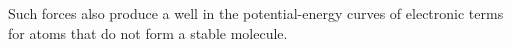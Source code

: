 Such forces also produce a well in the potential-energy curves of electronic terms for atoms that do not form a stable molecule.
